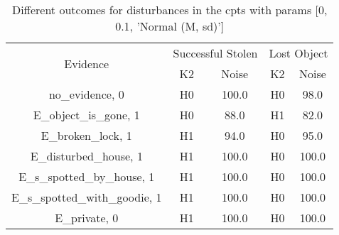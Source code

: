 \begin{table}\begin{tabular}{c|cc|cc}\toprule\multirow{2}{*}{Evidence} & \multicolumn{2}{c}{Successful Stolen} & \multicolumn{2}{c}{Lost Object} \\& {K2} & {Noise} & {K2} & {Noise} \\\midrule
no\_evidence, 0 & H0&100.0&H0&98.0\\E\_object\_is\_gone, 1 & \cellcolor{Bittersweet}H0&\cellcolor{Bittersweet}88.0&\cellcolor{Bittersweet}H1&\cellcolor{Bittersweet}82.0\\E\_broken\_lock, 1 & \cellcolor{Bittersweet}H1&\cellcolor{Bittersweet}94.0&H0&95.0\\E\_disturbed\_house, 1 & H1&100.0&H0&100.0\\E\_s\_spotted\_by\_house, 1 & H1&100.0&H0&100.0\\E\_s\_spotted\_with\_goodie, 1 & H1&100.0&H0&100.0\\E\_private, 0 & H1&100.0&H0&100.0\\\bottomrule\end{tabular}\caption{Different outcomes for disturbances in the cpts with params [0, 0.1, 'Normal (M, sd)']}\end{table}